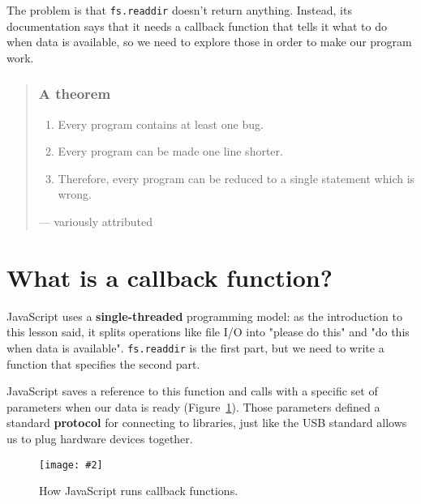 \documentclass[krantzl]{krantz}
\newcommand{\figpdf}[4]{\begin{figure}%
\centering%
\texttt{[image: \#2]}%
\caption{#3}%
\label{#1}%
\end{figure}}
\newcommand{\figref}[1]{Figure~\ref{#1}}
\newcommand{\glossref}[1]{\textbf{#1}}
\newenvironment{callout}{\savenotes\begin{tBox}\begin{quotation}\toggletrue{inbox}\renewcommand{\thempfootnote}{\arabic{footnote}}}{\end{quotation}\vspace{\baselineskip}\end{tBox}\togglefalse{inbox}\spewnotes}
\begin{document}
The problem is that \texttt{fs.readdir} doesn't return anything.
Instead,
its documentation says that it needs a callback function
that tells it what to do when data is available,
so we need to explore those in order to make our program work.

\begin{callout}


\subsubsection*{A theorem}

\begin{enumerate}

\item Every program contains at least one bug.

\item Every program can be made one line shorter.

\item Therefore, every program can be reduced to a single statement which is wrong.

\end{enumerate}


--- variously attributed

\end{callout}

\section{What is a callback function?}\label{systems-programming-callback}


JavaScript uses a \glossref{single-threaded} programming model:
as the introduction to this lesson said,
it splits operations like file I/O into "please do this" and "do this when data is available".
\texttt{fs.readdir} is the first part,
but we need to write a function that specifies the second part.


JavaScript saves a reference to this function
and calls with a specific set of parameters when our data is ready
(\figref{systems-programming-callbacks}).
Those parameters defined a standard \glossref{protocol}
for connecting to libraries,
just like the USB standard allows us to plug hardware devices together.

\figpdf{systems-programming-callbacks}{./systems-programming/callbacks.pdf}{How JavaScript runs callback functions.}{0.6}
\end{document}
